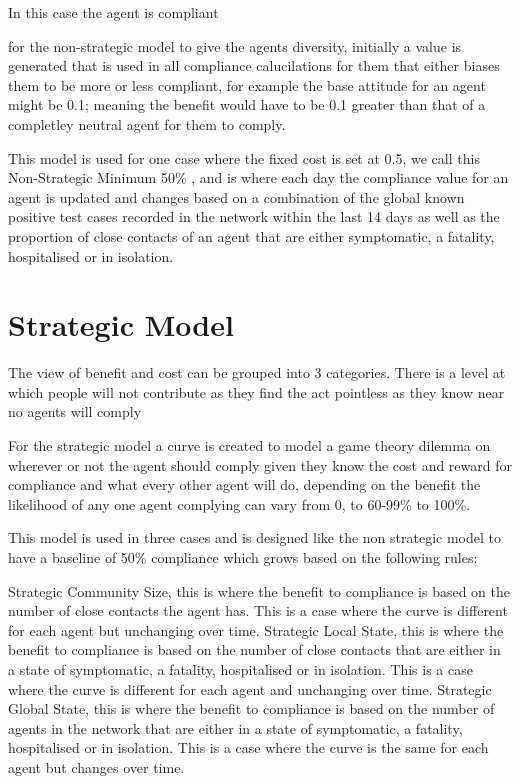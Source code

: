 \documentclass{article}
\begin{document}
In this case the agent is compliant

for the non-strategic model to give the agents diversity, initially a value is generated that is used in all compliance calucilations for them that either biases them to be more or less compliant, for example the base attitude for an agent might be 0.1; meaning the benefit would have to be 0.1 greater than that of a completley neutral agent for them to comply.

This model is used for one case where the fixed cost is set at 0.5, we call this Non-Strategic Minimum 50\% , and is where  each day the compliance value for an agent is updated and changes based on a combination of the global known positive test cases recorded in the network within the last 14 days as well as the proportion of close contacts of an agent that are either symptomatic, a fatality, hospitalised or in isolation.


\section{Strategic Model}
The view of benefit and cost can be grouped into 3 categories.
There is a level at which people will not contribute as they find the act pointless as they know near no agents will comply 

For the strategic model a curve is created to model a game theory dilemma on wherever or not the agent should comply given they know the cost and reward for compliance and what every other agent will do, depending on the benefit the likelihood of any one agent complying can vary from 0, to 60-99\% to 100\%.

This model is used in three cases and is designed like the non strategic model to have a baseline of 50\% compliance which grows based on the following rules:\newline

Strategic Community Size, this is where the benefit to compliance is based on the number of close contacts the agent has. This is a case where the curve is different for each agent but unchanging over time.\newline\newline
Strategic Local State, this is where the benefit to compliance is based on the number of close contacts that are either in a state of symptomatic, a fatality, hospitalised or in isolation. This is a case where the curve is different for each agent and unchanging over time.\newline\newline
Strategic Global State, this is where the benefit to compliance is based on the number of agents in the network that are either in a state of symptomatic, a fatality, hospitalised or in isolation. This is a case where the curve is the same for each agent but changes over time.
\end{document}
